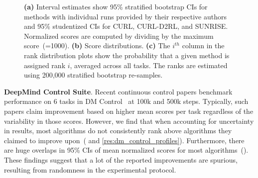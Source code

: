 \begin{figure}[t]
{    %
    \textbf{(a)} Interval estimates show 95\% stratified bootstrap CIs for methods with individual runs provided by their respective authors and 95\% studentized CIs for CURL, CURL-D2RL, and SUNRISE. Normalized scores are computed by dividing by the maximum score~(=1000). \textbf{(b)} Score distributions. \textbf{(c)} The $i^{th}$ column in the rank distribution plots show the probability that a given method is assigned rank $i$, averaged across all tasks.  The ranks are estimated using 200,000 stratified bootstrap re-samples.}\label{res:dm_control}
    \vspace{-0.45cm}
\end{figure}


\textbf{DeepMind Control Suite}. Recent continuous control papers benchmark performance on 6 tasks in DM Control~\citep{tassa2018deepmind} at 100k and 500k steps. Typically, such papers claim improvement based on higher mean scores per task regardless of the variability in those scores. However, we find that when accounting for uncertainty in results, most algorithms do not consistently rank above algorithms they claimed to improve upon~( and \ref{res:dm_control_profiles}). Furthermore, there are huge overlaps in 95\% CIs of mean normalized scores for most algorithms~(). These findings suggest that a lot of the reported improvements are spurious, resulting from randomness in the experimental protocol.





